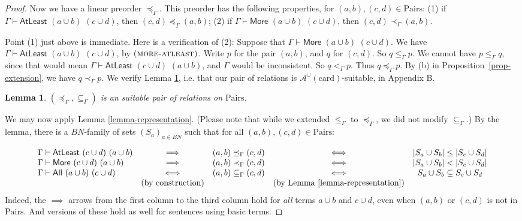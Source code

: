 \documentclass[letterpaper]{article} %
\newtheorem{lemma}[theorem]{Lemma}
\theoremstyle{definition}
\newcommand{\proves}{\vdash}
\newcommand{\Aunion}{\mathscr{A}^{\cup}}
\newcommand{\proverule}{\textsc}
\newcommand{\All}[2]{\mathsf{All}\,\,#1\,\,#2}
\newcommand{\Atleast}[2]{\mathsf{AtLeast}\,\,#1\,\,#2}
\newcommand{\More}[2]{\mathsf{More}\,\,#1\,\,#2}
\newcommand{\card}{\mathrm{card}}
\newcommand{\Pairs}{\mbox{Pairs}}
\newcommand{\suitable}{suitable}%
\newcommand{\provsub}{\subseteq_{\Gamma}}
\newcommand{\provle}{\le_{\Gamma}}
\newcommand{\provlt}{<_{\Gamma}}
\newcommand{\provlestrict}{\provlt}
\newcommand{\provextended}{\preceq_{\Gamma}}
\newcommand{\provextendedstrict}{\prec_{\Gamma}}
\begin{document}
{\begin{proof}
Now we have a linear preorder $\provextended$.
This preorder has the following properties, for $(a,b), (c,d)\in \Pairs$:
(1) if $\Gamma \vdash \Atleast{(a\cup b)}{(c\cup d)}$, 
    then $(c,d) \provextended (a,b)$;
(2) if $\Gamma \vdash \More{(a\cup b)}{(c\cup d)}$, then $(c,d) \provextendedstrict (a,b)$.
  

Point (1) just above is immediate.
Here is a verification of (2): Suppose that $\Gamma \vdash \More{(a\cup b)}{(c\cup d)}$.
We have  $\Gamma \vdash \Atleast{(a\cup b)}{(c\cup d)}$, by $\proverule{(more-atleast)}$.
Write $p$ for the pair $(a,b)$, and $q$ for $(c,d)$.
So $q \provle p$.
We cannot have $p \provle q$, since that would mean $\Gamma \vdash \Atleast{(c\cup d)}{(a\cup b)}$,
and  $\Gamma$ would be inconsistent.   So $q \provlestrict p$.
  Thus $q \provextended p$.  By (b) in Proposition~\ref{prop-extension}, we have
  $q \provextendedstrict p$.
We verify Lemma \ref{lemma-provpair}, i.e. that our pair of relations is $\Aunion(\card)$-suitable, in Appendix B.

\begin{lemma}
\label{lemma-provpair}
$(\provextended, \provsub)$ is an  \suitable{} pair of relations on $\Pairs$.
\end{lemma}



We may now apply Lemma \ref{lemma-representation}. 
(Please note that while we extended $\provle$ to $\provextended$, we did not modify $\provsub$.)
By the lemma, there is a $BN$-family of sets $(S_a)_{a\in BN}$ such that for all 
$(a,b),(c,d) \in \Pairs$:

\[
\begin{array}{lcccc}
\Gamma \proves \Atleast{(c \cup d)}{(a \cup b)} & \implies & 
    (a,b) \provextended (c,d) & \iff & 
    |S_a \cup S_b| \le |S_c \cup S_d|\\
\Gamma \proves \More{(c \cup d)}{(a \cup b)} & \implies & 
    (a,b) \provextendedstrict (c,d) & \iff & 
    |S_a \cup S_b| < |S_c \cup S_d|\\
\Gamma \proves \All{(a \cup b)}{(c \cup d)} & \iff & 
    (a,b) \provsub (c,d) & \iff & 
    S_a \cup S_b \subseteq S_c \cup S_d\\
& (\textrm{by construction}) & & (\textrm{by Lemma \ref{lemma-representation}}) & 
\end{array}
\]
Indeed, the $\implies$ arrows from the first column to the third column
hold for \emph{all} terms $a\cup b$ and $c\cup d$, even when $(a,b)$ or 
$(c,d)$ is not in $\Pairs$.  And versions of these hold as well for 
sentences using basic terms.



\end{proof}}
\end{document}
